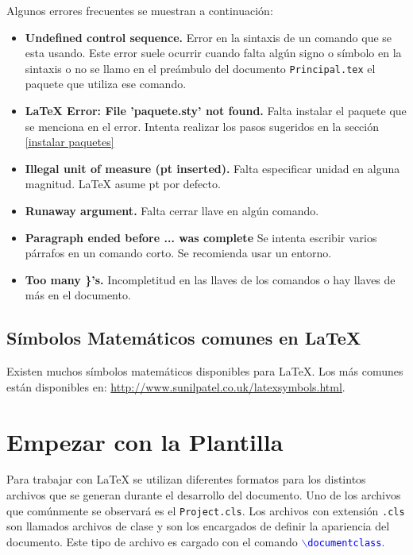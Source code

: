Algunos errores frecuentes se muestran a continuaci\'{o}n:

\begin{itemize}

\item \textbf{ Undefined control sequence.} Error en la sintaxis de un comando que se esta usando. Este error suele ocurrir cuando falta algún signo o símbolo en la sintaxis o no se llamo en el preámbulo del documento \texttt{Principal.tex} el paquete que utiliza ese comando.
\item \textbf{ LaTeX Error: File ’paquete.sty’ not found.} Falta instalar el paquete que se menciona en el error. Intenta realizar los pasos sugeridos en la sección \ref{instalar paquetes}
\item \textbf{ Illegal unit of measure (pt inserted).} Falta especificar unidad en alguna magnitud. \LaTeX{} asume pt por defecto.
\item \textbf{ Runaway argument.} Falta cerrar llave en algún comando.
\item \textbf{ Paragraph ended before ... was complete} Se intenta escribir varios párrafos en un comando corto. Se recomienda usar un entorno.
\item \textbf{ Too many \}’s.} Incompletitud en las llaves de los comandos o hay llaves de más en el documento.

\end{itemize}

\subsection{Símbolos Matemáticos comunes en \LaTeX{} }

Existen muchos símbolos matem\'{a}ticos disponibles para \LaTeX{}. Los m\'{a}s comunes est\'{a}n disponibles en: \url{http://www.sunilpatel.co.uk/latexsymbols.html}.


\section{Empezar con la Plantilla}

Para trabajar con \LaTeX{} se utilizan diferentes formatos para los distintos archivos que se generan durante el desarrollo del documento. Uno de los archivos que com\'{u}nmente se observar\'{a} es el \texttt{Project.cls}. Los archivos con extensi\'{o}n \texttt{.cls} son llamados archivos de clase y son los encargados de definir la apariencia del documento. Este tipo de archivo es cargado con el comando \textcolor{blue}{$\backslash$\texttt{documentclass}}.

